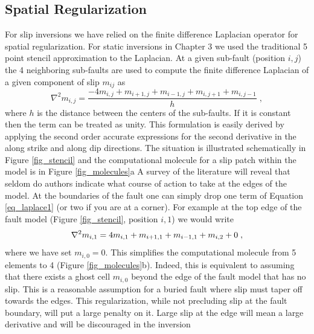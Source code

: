 \subsection{Spatial Regularization}

\label{sec:regu}

For slip inversions we have relied on the finite difference Laplacian operator for spatial regularization. For static inversions in Chapter 3 we used the traditional 5 point stencil approximation to the Laplacian. At a given sub-fault (position $i,j$) the 4 neighboring sub-faults are used to compute the finite difference Laplacian of a given component of  slip $m_{ij}$ as
\begin{equation}
\label{eq_laplace1}
\nabla^2m_{i,j}=\frac{-4m_{i,j}+m_{i+1,j}+m_{i-1,j}+m_{i,j+1}+m_{i,j-1}}{h}\;,
\end{equation}
where $h$ is the distance between the centers of the sub-faults. If it is constant then the term can be treated as unity. This formulation is easily derived by applying the second order accurate expressions for the second derivative in the along strike and along dip directions.  The situation is illustrated schematically in Figure \ref{fig_stencil} and the computational molecule for a slip patch within the model is in Figure \ref{fig_molecules}a  A survey of the literature will reveal that seldom do authors indicate what course of action to take at the edges of the model. At the boundaries of the fault one can simply drop one term of Equation \ref{eq_laplace1} (or two if you are at a corner). For example at the top edge of the fault model  (Figure \ref{fig_stencil}, position $i,1$) we would write
\begin{equation}
\label{eq_laplace2}
\nabla^2m_{i,1}=\-4m_{i,1}+m_{i+1,1}+m_{i-1,1}+m_{i,2}+0\;,
\end{equation}
where we have set $m_{i,0}=0$. This simplifies the computational molecule from 5 elements to 4 (Figure \ref{fig_molecules}b). Indeed, this is equivalent to assuming that there exists a ghost cell $m_{i,0}$ beyond the edge of the fault model that has no slip. This is a reasonable assumption for a buried fault where slip must taper off towards the edges. This regularization, while not precluding slip at the fault boundary, will put a large penalty on it. Large slip at the edge will mean a large derivative and will be discouraged in the inversion

